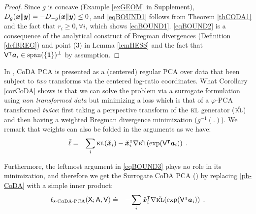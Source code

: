 \documentclass{article}
\begin{document}
\begin{proof}
Since $g$ is concave (Example \ref{exGEOM} in Supplement), $D_g(\bm{x}\|\bm{y}) = -
D_{-g}(\bm{x}\|\bm{y})\leq 0$, and \eqref{eqBOUND1} follows from
Theorem \ref{thCODA1} and the fact that $r_i\geq 0, \forall i$, which
shows \eqref{eqBOUND1}. \eqref{eqBOUND2} is a consequence of the
analytical construct of Bregman divergences (Definition \ref{defBREG}) and point (3)
in Lemma \ref{lemHESS}
 and the fact that $\mathsf{V}^\intercal
   \bm{a}_i \in \mathrm{span}(\{\bm{1}\})^\bot$ by assumption.
\end{proof}
\begin{remark}
In \cite[Chapter 8]{aTSB}, CoDA PCA is presented as a (centered)
regular PCA over data that been subject to \textit{two} transforms via the
centered log-ratio coordinates. What Corollary \ref{corCoDA} shows is
that we can solve the problem via a surrogate formulation using \textit{non transformed data} but
minimizing a loss which is that of a $\varphi$-PCA transformed \textit{twice}: first taking a perspective transform of the
${\textsc{kl}}$ generator ($\check{{\textsc{kl}}}$) and then having a weighted Bregman
divergence minimization ($g^{-1}(.)$). We remark that weights can also
be folded in the arguments as we have:
\begin{eqnarray}
\tilde{\ell}   & = & \sum_i {\textsc{kl}}(\check{\bm{x}}_i) - \check{\bm{x}}_i^\intercal \nabla \check{{\textsc{kl}}}(\exp(\mathsf{V}^\intercal
   \bm{a}_i)) \:\:.\label{eqBOUND3}
\end{eqnarray}
\end{remark}

Furthermore, the leftmost argument in \eqref{eqBOUND3} plays no role in its minimization,
and therefore we get the Surrogate CoDA PCA (\surrogateCoDAPCA) by
replacing \eqref{pb-CoDA} with a simple inner product:
\begin{eqnarray}
\ell_{\textsc{s-}\textsc{CoDA-PCA}}(\mathsf{X}; \mathsf{A}, \mathsf{V}) & \stackrel{\mathrm{.}}{=} &
- \sum_i \check{\bm{x}}_i^\intercal \nabla \check{{\textsc{kl}}}(\exp(\mathsf{V}^\intercal \bm{a}_i))\:\:.\label{pb-s-CoDA}
\end{eqnarray}
\end{document}
